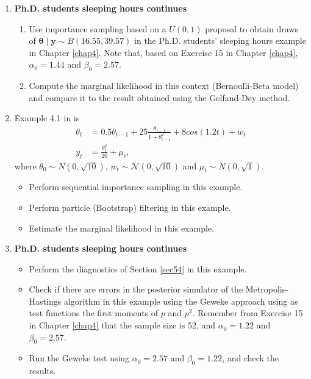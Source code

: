 \begin{enumerate}
 \item \textbf{Ph.D. students sleeping hours continues}
\begin{enumerate}
	\item Use importance sampling based on a $U(0,1)$ proposal to obtain draws of $\bm{\theta}\mid \bm{y} \sim B(16.55,39.57)$ in the Ph.D. students' sleeping hours example in Chapter \ref{chap4}. Note that, based on Exercise 15 in Chapter \ref{chap4}, $\alpha_0 = 1.44$ and $\beta_0 = 2.57$.
	\item Compute the marginal likelihood in this context (Bernoulli-Beta model) and compare it to the result obtained using the Gelfand-Dey method.
\end{enumerate}

\item Example 4.1 in \cite{Gordon1993} is 
\begin{align*}
	\theta_t&=0.5\theta_{t-1}+25\frac{\theta_{t-1}}{1+\theta_{t-1}^2}+8cos(1.2t)+w_t\\
	y_t&=\frac{\theta_{t}^2}{20}+\mu_t,
\end{align*}
where $\theta_0\sim{N}(0,\sqrt{10})$, $w_t\sim\mathcal{N}(0,\sqrt{10})$ and $\mu_t\sim{N}(0,\sqrt{1})$.
\begin{itemize}
	\item Perform sequential importance sampling in this example.
	\item Perform particle (Bootstrap) filtering in this example.
	\item Estimate the marginal likelihood in this example.  
\end{itemize}

\item \textbf{Ph.D. students sleeping hours continues}

\begin{itemize}
	\item Perform the diagnostics of Section \ref{sec54} in this example.
	\item Check if there are errors in the posterior simulator of the Metropolis-Hastings algorithm in this example using the Geweke approach using as test functions the first moments of $p$ and $p^2$. Remember from Exercise 15 in Chapter \ref{chap4} that the sample size is 52, and $\alpha_0=1.22$ and $\beta_0=2.57$.
	\item Run the Geweke test using $\alpha_0=2.57$ and $\beta_0=1.22$, and check the results.
\end{itemize} 
	
\end{enumerate}



